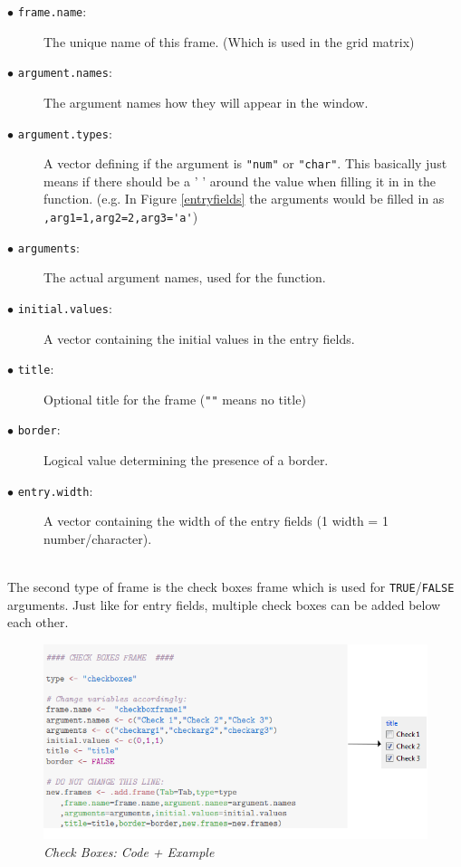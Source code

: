 \documentclass[a4paper]{article}\usepackage[]{graphicx}\usepackage[]{color}
\begin{document}
\begin{description}
  \item[$\bullet$ \texttt{frame.name}:] The unique name of this frame. (Which is used in the grid matrix)
  \item[$\bullet$ \texttt{argument.names}:] The argument names how they will
  appear in the window.
  \item[$\bullet$ \texttt{argument.types}:] A vector defining if the argument is
  \verb|"num"| or \verb|"char"|. This basically just means if there should be a
  ' ' around the value when filling it in in the function. (e.g. In
  Figure \ref{entryfields} the arguments would be filled in as \verb|,arg1=1,arg2=2,arg3='a'|)
  \item[$\bullet$ \texttt{arguments}:] The actual argument names, used for the
  function.
  \item[$\bullet$ \texttt{initial.values}:] A vector containing the initial
  values in the entry fields.
  \item[$\bullet$ \texttt{title}:] Optional title for the frame (\verb|""| means no title)
  \item[$\bullet$ \texttt{border}:] Logical value determining the presence of a
  border.
  \item[$\bullet$ \texttt{entry.width}:] A vector containing the width of the
  entry fields (1 width = 1 number/character).
\end{description}

\\
The second type of frame is the check boxes frame which is used for
\verb|TRUE|/\verb|FALSE| arguments. Just like for entry fields, multiple check
boxes can be added below each other. 
\begin{figure}[H]
\centering
\includegraphics[scale=0.5]{figures/checkboxes.png}
\caption{{\it Check Boxes: Code + Example}
\label{checkboxes}}
\end{figure}
\end{document}
